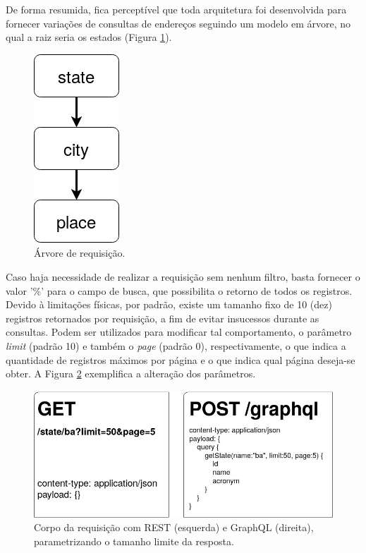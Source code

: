 \documentclass[conference]{IEEEtran}
\begin{document}
De forma resumida, fica perceptível que toda arquitetura foi desenvolvida para fornecer variações de consultas de endereços seguindo um modelo em árvore, no qual a raiz seria os estados (Figura \ref{fig:arvore_req}).

\begin{figure}[htbp]
\centerline{\includegraphics[scale=0.45]{imgs/arvore_req.jpg}}
\caption{Árvore de requisição.}
\label{fig:arvore_req}
\end{figure}

Caso haja necessidade de realizar a requisição sem nenhum filtro, basta fornecer o valor '\%' para o campo de busca, que possibilita o retorno de todos os registros. Devido à limitações físicas, por padrão, existe um tamanho fixo de 10 (dez) registros retornados por requisição, a fim de evitar insucessos durante as consultas. Podem ser utilizados para modificar tal comportamento, o parâmetro \textit{limit} (padrão 10) e também o \textit{page} (padrão 0), respectivamente, o que indica a quantidade de registros máximos por página e o que indica qual página deseja-se obter. A Figura \ref{fig:req_rg_lp} exemplifica a alteração dos parâmetros.

\begin{figure}[htbp]
\centerline{\includegraphics[scale=0.30]{imgs/req_rest_graphql_lp.jpg}}
\caption{Corpo da requisição com REST (esquerda) e GraphQL (direita), parametrizando o tamanho limite da resposta.}
\label{fig:req_rg_lp}
\end{figure}
\end{document}
